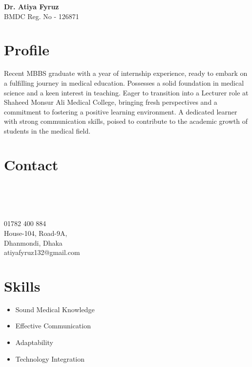 \documentclass[a4paper,12pt]{article}
\begin{document}
\begin{minipage}[t]{\textwidth}
    \raggedright
    {\Huge\bfseries\color{black}Dr. Atiya Fyruz}\\
    \large{BMDC Reg. No - 126871}
    \vspace{1.5cm}    
\end{minipage}
\begin{minipage}[t][6.4cm]{\textwidth}
\section*{Profile}
  Recent MBBS graduate with a year of internship experience, ready to embark on a fulfilling journey in medical education. 
  Possesses a solid foundation in medical science and a keen interest in teaching. 
  Eager to transition into a Lecturer role at Shaheed Monsur Ali Medical College, bringing fresh perspectives and a commitment to fostering a positive learning environment. 
  A dedicated learner with strong communication skills, poised to contribute to the academic growth of students in the medical field.
\end{minipage}
\begin{minipage}[t][12cm]{0.35\textwidth}
\raggedright
\section*{Contact}
    \begin{minipage}[t]{0.1\textwidth}
        \faPhone\\
        \faMapMarker\\ \\
        \faEnvelopeO
    \end{minipage}
    \begin{minipage}[t]{0.7\textwidth}
        01782 400 884\\
        House-104, Road-9A,\\ Dhanmondi, Dhaka\\
        atiyafyruz132@gmail.com
    \end{minipage}
\section*{Skills}
\begin{itemize}[left=0em, itemsep=0pt, parsep=0pt]
  \item Sound Medical Knowledge
  \item Effective Communication
  \item Adaptability
  \item Technology Integration
\end{itemize}

\end{minipage}
\end{document}
